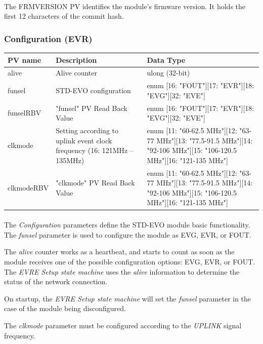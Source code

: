 \documentclass[openany]{article}
\begin{document}
			\paragraph{} The FRMVERSION PV identifies the module's firmware version. It holds the first 12 characters of
the commit hash.

		\subsubsection{Configuration (EVR)}\label{pvgroup:evr-configuration}
			\begin{center}
			\begin{tabular}{| m{2.8cm} m{6cm} m{6cm} |}
			    \hline
			    \bfseries PV name & \bfseries Description & \bfseries Data Type \\ \hline
			    alive & Alive counter & ulong (32-bit) \\ \hline
			    funsel & STD-EVO configuration & enum [16: "FOUT"][17: "EVR"][18: "EVG"][32: "EVE"] \\ \hline
			    funselRBV & "funsel" PV Read Back Value & enum [16: "FOUT"][17: "EVR"][18: "EVG"][32: "EVE"] \\ \hline
			    clkmode & Setting according to uplink event clock frequency (16: 121MHz – 135MHz) & enum [11: "60-62.5 MHz"][12: "63-77 MHz"][13: "77.5-91.5 MHz"][14: "92-106 MHz"][15: "106-120.5 MHz"][16: "121-135 MHz"] \\ \hline
			    clkmodeRBV & "clkmode" PV Read Back Value & enum [11: "60-62.5 MHz"][12: "63-77 MHz"][13: "77.5-91.5 MHz"][14: "92-106 MHz"][15: "106-120.5 MHz"][16: "121-135 MHz"] \\ \hline
			\end{tabular}
			\end{center}

			\paragraph{} The \emph{Configuration} parameters define the STD-EVO module basic functionality. The \emph{funsel} parameter is used to configure the module as EVG, EVR, or FOUT. 
			\par The \emph{alive} counter works as a heartbeat, and starts to count as soon as the module receives one of the possible configuration options: EVG, EVR, or FOUT. The \emph{EVRE Setup state machine} uses the \emph{alive} information to determine the status of the network connection.
			\par On startup, the \emph{EVRE Setup state machine} will set the \emph{funsel} parameter in the case of the module being disconfigured.
			\par The \emph{clkmode} parameter must be configured according to the \emph{UPLINK} signal frequency.
\end{document}
